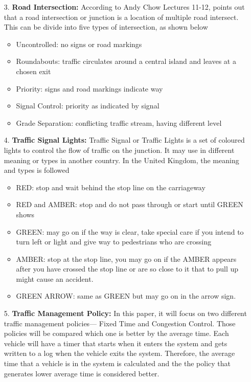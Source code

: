 \documentclass[11pt]{article}
\begin{document}
\begin{itemize}
\begin{center}
		\end{center}  	
		\item[3. ]\textbf{Road Intersection:}	
		According to Andy Chow Lectures 11-12, \cite{Lecture} points out that a road intersection or junction is a location of multiple road intersect. This can be divide into five types of intersection, as shown below
		\begin{itemize}
			\item{} Uncontrolled: no signs or road markings
			\item{} Roundabouts: traffic circulates around a central island and leaves at a chosen exit
			\item{} Priority: signs and road markings indicate way
			\item{} Signal Control: priority as indicated by signal
			\item{} Grade Separation: conflicting traffic stream, having different level
  		\end{itemize}	
		\item[4. ]\textbf{Traffic Signal Lights:}
		Traffic Signal or Traffic Lights is a set of coloured lights to control the flow of traffic on the junction. It may use in different meaning or types in another country. In the United Kingdom, the meaning and types is followed
  		\begin{itemize}
			\item{} RED: stop and wait behind the stop line on the carriageway
			\item{} RED and AMBER: stop and do not pass through or start until GREEN shows
			\item{} GREEN: may go on if the way is clear, take special care if you intend to turn left or light and give way to pedestrians who are crossing
			\item{} AMBER: stop at the stop line, you may go on if the AMBER appears after you have crossed the stop line or are so close to it that to pull up might cause an accident. 			\item{} GREEN ARROW: same as GREEN but may go on in the arrow sign.
  		\end{itemize}	
		\item[5. ]\textbf{Traffic Management Policy:}
		In this paper, it will focus on two different traffic management policies— Fixed Time and Congestion Control. Those policies will be compared which one is better by the average time. Each vehicle will have a timer that starts when it enters the system and gets written to a log when the vehicle exits the system. Therefore, the average time that a vehicle is in the system is calculated and the the policy that generates lower average time is considered better.

\end{itemize}
\end{document}
